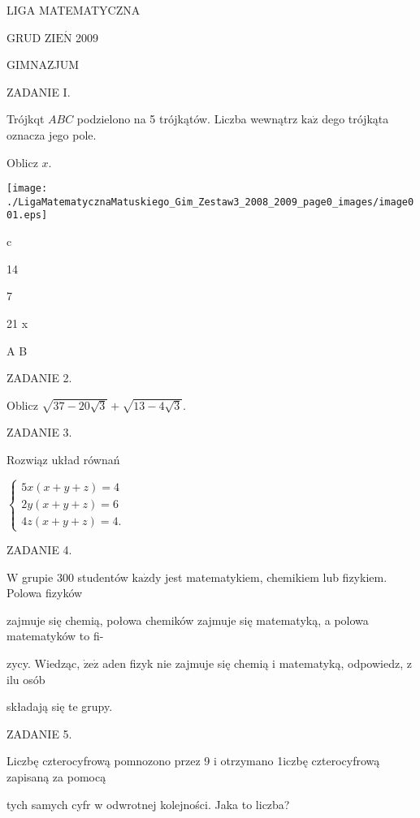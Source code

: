 \documentclass[a4paper,12pt]{article}
\begin{document}
LIGA MATEMATYCZNA

GRUD Z$\mathrm{I}\mathrm{E}\acute{\mathrm{N}}$ 2009

GIMNAZJUM

ZADANIE I.

Trójkqt $ABC$ podzielono na 5 trójkątów. Liczba wewnątrz $\mathrm{k}\mathrm{a}\dot{\mathrm{z}}$ dego trójkąta oznacza jego pole.

Oblicz $x.$
\begin{center}
\texttt{[image: ./LigaMatematycznaMatuskiego\_Gim\_Zestaw3\_2008\_2009\_page0\_images/image001.eps]}
\end{center}
c

14

7

21  x

A  B

ZADANIE 2.

Oblicz $\sqrt{37-20\sqrt{3}}+\sqrt{13-4\sqrt{3}}.$

ZADANIE 3.

Rozwiąz układ równań

$\left\{\begin{array}{l}
5x(x+y+z)=4\\
2y(x+y+z)=6\\
4z(x+y+z)=4.
\end{array}\right.$

ZADANIE 4.

$\mathrm{W}$ grupie 300 studentów $\mathrm{k}\mathrm{a}\dot{\mathrm{z}}\mathrm{d}\mathrm{y}$ jest matematykiem, chemikiem lub fizykiem. Polowa fizyków

zajmuje się chemią, połowa chemików zajmuje się matematyką, a polowa matematyków to fi-

zycy. Wiedząc, $\dot{\mathrm{z}}\mathrm{e}\dot{\mathrm{z}}$ aden fizyk nie zajmuje się chemią i matematyką, odpowiedz, z ilu osób

składają się te grupy.

ZADANIE 5.

Liczbę czterocyfrową pomnozono przez 9 i otrzymano 1iczbę czterocyfrową zapisaną za pomocą

tych samych cyfr w odwrotnej kolejności. Jaka to liczba?
\end{document}

